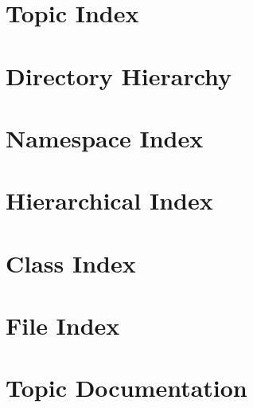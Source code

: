 \documentclass[twoside]{book}
\newcommand{\+}{\discretionary{\mbox{\scriptsize$\hookleftarrow$}}{}{}}
\begin{document}
\chapter{Topic Index}

\chapter{Directory Hierarchy}

\chapter{Namespace Index}

\chapter{Hierarchical Index}

\chapter{Class Index}

\chapter{File Index}

\chapter{Topic Documentation}














\end{document}
